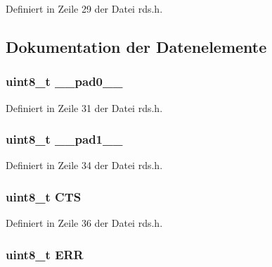Definiert in Zeile 29 der Datei rds.\+h.



\subsection{Dokumentation der Datenelemente}
\hypertarget{structstatus_a8b4eebe79ded0459acec2f4950102ba3}{}
\subsubsection[{\+\_\+\+\_\+pad0\+\_\+\+\_\+}]{\setlength{\rightskip}{0pt plus 5cm}uint8\+\_\+t \+\_\+\+\_\+pad0\+\_\+\+\_\+}\label{structstatus_a8b4eebe79ded0459acec2f4950102ba3}


Definiert in Zeile 31 der Datei rds.\+h.

\hypertarget{structstatus_a77f12d2e278bd5c07712648ac0df5e08}{}
\subsubsection[{\+\_\+\+\_\+pad1\+\_\+\+\_\+}]{\setlength{\rightskip}{0pt plus 5cm}uint8\+\_\+t \+\_\+\+\_\+pad1\+\_\+\+\_\+}\label{structstatus_a77f12d2e278bd5c07712648ac0df5e08}


Definiert in Zeile 34 der Datei rds.\+h.

\hypertarget{structstatus_a7f1760325354f291b9a0190e7e355ca8}{}
\subsubsection[{C\+T\+S}]{\setlength{\rightskip}{0pt plus 5cm}uint8\+\_\+t C\+T\+S}\label{structstatus_a7f1760325354f291b9a0190e7e355ca8}


Definiert in Zeile 36 der Datei rds.\+h.

\hypertarget{structstatus_afb74dff3cfacd68c02883e5282ef2f59}{}
\subsubsection[{E\+R\+R}]{\setlength{\rightskip}{0pt plus 5cm}uint8\+\_\+t {\bf E\+R\+R}}\label{structstatus_afb74dff3cfacd68c02883e5282ef2f59}


